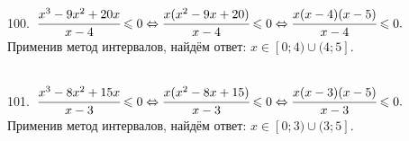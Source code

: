 \documentclass[12pt]{article}
\begin{document}
\begin{figure}[ht!]
\end{figure}\\
100. $\cfrac{x^3-9x^2+20x}{x-4}\leqslant0\Leftrightarrow \cfrac{x(x^2-9x+20)}{x-4}\leqslant0\Leftrightarrow\cfrac{x(x-4)(x-5)}{x-4}\leqslant0.$ Применив метод интервалов, найдём ответ: $x\in[0;4)\cup(4;5].$
\begin{figure}[ht!]
\end{figure}\\
101. $\cfrac{x^3-8x^2+15x}{x-3}\leqslant0\Leftrightarrow \cfrac{x(x^2-8x+15)}{x-3}\leqslant0\Leftrightarrow\cfrac{x(x-3)(x-5)}{x-3}\leqslant0.$ Применив метод интервалов, найдём ответ: $x\in[0;3)\cup(3;5].$
\begin{figure}[ht!]
\end{figure}
\newpage
\end{document}
